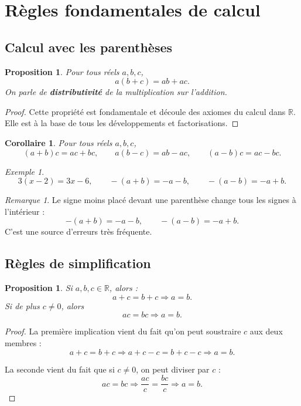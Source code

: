 \documentclass[11pt,a4paper]{article}
\newtheorem{proposition}[definition]{Proposition}
\newtheorem{corollaire}[definition]{Corollaire}
\theoremstyle{remark}
\newtheorem{remarque}[definition]{Remarque}
\newtheorem{exemple}[definition]{Exemple}
\newcommand{\R}{\mathbb{R}}
\begin{document}
\section{Règles fondamentales de calcul}

\subsection{Calcul avec les parenthèses}

\begin{proposition}
Pour tous réels \(a,b,c\),
\[
a(b+c)=ab+ac.
\]
On parle de \textbf{distributivité} de la multiplication sur l’addition.
\end{proposition}

\begin{proof}
Cette propriété est fondamentale et découle des axiomes du calcul dans \(\R\). Elle est à la base de tous les développements et factorisations.
\end{proof}

\begin{corollaire}
Pour tous réels \(a,b,c\),
\[
(a+b)c=ac+bc,
\qquad
a(b-c)=ab-ac,
\qquad
(a-b)c=ac-bc.
\]
\end{corollaire}

\begin{exemple}
\[
3(x-2)=3x-6,
\qquad
-(a+b)=-a-b,
\qquad
-(a-b)=-a+b.
\]
\end{exemple}

\begin{remarque}
Le signe moins placé devant une parenthèse change tous les signes à l’intérieur :
\[
-(a+b)=-a-b,
\qquad
-(a-b)=-a+b.
\]
C’est une source d’erreurs très fréquente.
\end{remarque}

\subsection{Règles de simplification}

\begin{proposition}
Si \(a,b,c\in\R\), alors :
\[
a+c=b+c \Longrightarrow a=b.
\]
Si de plus \(c\neq 0\), alors
\[
ac=bc \Longrightarrow a=b.
\]
\end{proposition}

\begin{proof}
La première implication vient du fait qu’on peut soustraire \(c\) aux deux membres :
\[
a+c=b+c \Longrightarrow a+c-c=b+c-c \Longrightarrow a=b.
\]

La seconde vient du fait que si \(c\neq 0\), on peut diviser par \(c\) :
\[
ac=bc \Longrightarrow \frac{ac}{c}=\frac{bc}{c} \Longrightarrow a=b.
\]
\end{proof}
\end{document}
